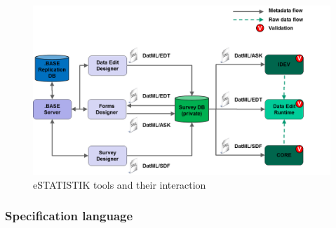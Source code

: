 \begin{figure}
\begin{center}
\includegraphics[scale=0.5]{fig/estattools.png} 
\end{center}
\caption{eSTATISTIK tools and their interaction}
\label{estattools}
\end{figure}


\subsubsection{Specification language}


  


